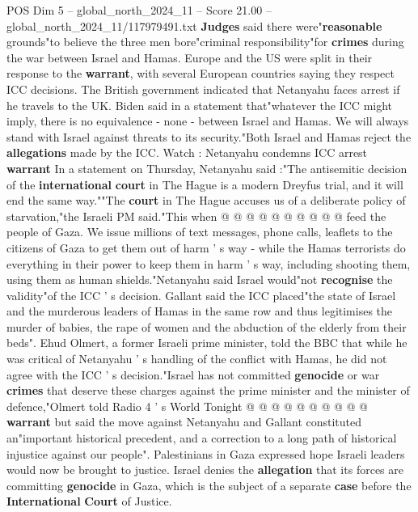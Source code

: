 \begin{textsample}{POS Dim 5 – global\_north\_2024\_11 – Score 21.00 – global\_north\_2024\_11/117979491.txt}  \label{ex:f5_pos_032}
\textbf{Judges} said there were"\textbf{reasonable} grounds"to believe the three men bore"criminal responsibility"for \textbf{crimes} during the war between Israel and Hamas.
Europe and the US were split in their response to the \textbf{warrant}, with several European countries saying they respect ICC decisions.
The British government indicated that Netanyahu faces arrest if he travels to the UK.
Biden said in a statement that"whatever the ICC might imply, there is no equivalence - none - between Israel and Hamas.
We will always stand with Israel against threats to its security."Both Israel and Hamas reject the \textbf{allegations} made by the ICC.
Watch : Netanyahu condemns ICC arrest \textbf{warrant} In a statement on Thursday, Netanyahu said :"The antisemitic decision of the \textbf{international} \textbf{court} in The Hague is a modern Dreyfus trial, and it will end the same way.""The \textbf{court} in The Hague accuses us of a deliberate policy of starvation,"the Israeli PM said."This when @ @ @ @ @ @ @ @ @ @ feed the people of Gaza.
We issue millions of text messages, phone calls, leaflets to the citizens of Gaza to get them out of harm ' s way - while the Hamas terrorists do everything in their power to keep them in harm ' s way, including shooting them, using them as human shields."Netanyahu said Israel would"not \textbf{recognise} the validity"of the ICC ' s decision.
Gallant said the ICC placed"the state of Israel and the murderous leaders of Hamas in the same row and thus legitimises the murder of babies, the rape of women and the abduction of the elderly from their beds".
Ehud Olmert, a former Israeli prime minister, told the BBC that while he was critical of Netanyahu ' s handling of the conflict with Hamas, he did not agree with the ICC ' s decision."Israel has not committed \textbf{genocide} or war \textbf{crimes} that deserve these charges against the prime minister and the minister of defence,"Olmert told Radio 4 ' s World Tonight @ @ @ @ @ @ @ @ @ @ \textbf{warrant} but said the move against Netanyahu and Gallant constituted an"important historical precedent, and a correction to a long path of historical injustice against our people".
Palestinians in Gaza expressed hope Israeli leaders would now be brought to justice.
Israel denies the \textbf{allegation} that its forces are committing \textbf{genocide} in Gaza, which is the subject of a separate \textbf{case} before the \textbf{International} \textbf{Court} of Justice.

\end{textsample}
